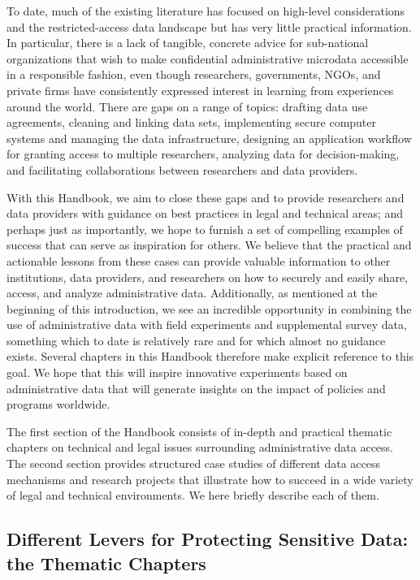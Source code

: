 To date, much of the existing literature has focused on high-level considerations and the restricted-access data landscape \citep{harron2017} but has very little practical information. In particular, there is a lack of tangible, concrete advice for sub-national organizations that wish to make confidential administrative microdata accessible in a responsible fashion, even though researchers, governments, NGOs, and private firms have consistently expressed interest in learning from experiences around the world. There are gaps on a range of topics: drafting data use agreements, cleaning and linking data sets, implementing secure computer systems and managing the data infrastructure, designing an application workflow for granting access to multiple researchers, analyzing data for decision-making, and facilitating collaborations between researchers and data providers.

With this Handbook, we aim to close these gaps and to provide researchers and data providers with guidance on best practices in legal and technical areas; and perhaps just as importantly, we hope to furnish a set of compelling examples of success that can serve as inspiration for others. We believe that the practical and actionable lessons from these cases can provide valuable information to other institutions, data providers, and researchers on how to securely and easily share, access, and analyze administrative data. Additionally, as mentioned at the beginning of this introduction, we see an incredible opportunity in combining the use of administrative data with field experiments and supplemental survey data, something which to date is relatively rare and for which almost no guidance exists. Several chapters in this Handbook therefore make explicit reference to this goal. We hope that this will inspire innovative experiments based on administrative data that will generate insights on the impact of policies and programs worldwide.

The first section of the Handbook consists of in-depth and practical thematic chapters on technical and legal issues surrounding administrative data access. The second section provides structured case studies of different data access mechanisms and research projects that illustrate how to succeed in a wide variety of legal and technical environments. We here briefly describe each of them.

\hypertarget{different-levers-for-protecting-sensitive-data-the-thematic-chapters}{%
\subsection{Different Levers for Protecting Sensitive Data: the Thematic Chapters}\label{different-levers-for-protecting-sensitive-data-the-thematic-chapters}}

